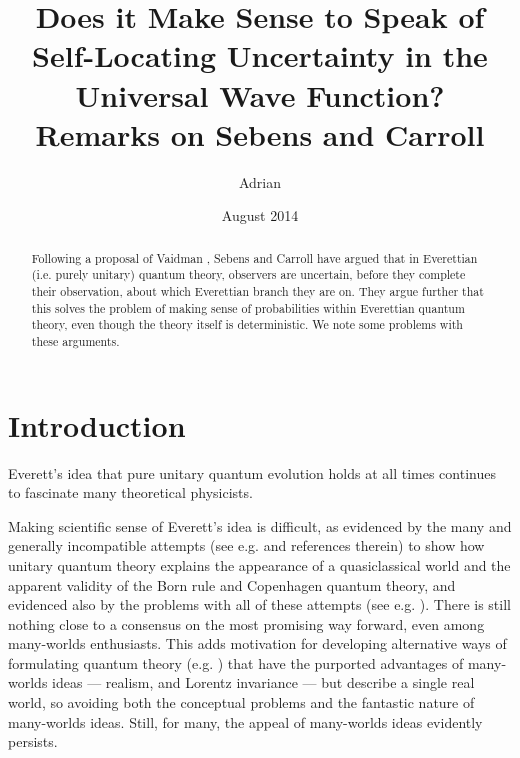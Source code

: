 \documentclass[aps,prl,12pt]{revtex4}
\begin{document}
\title{Does it Make Sense to Speak of
Self-Locating Uncertainty in the Universal Wave
Function? Remarks on Sebens and Carroll}

\author{Adrian }

\date{August 2014} 

\begin{abstract}
Following a proposal of Vaidman \cite{vaidman1998,vaidman2008,vaidman2011},
Sebens and Carroll \cite{cs1,cs2} have argued that 
in Everettian (i.e. purely unitary) quantum theory,
observers are uncertain, before they complete
their observation, about which Everettian
branch they are on.  They argue further that this
solves the problem of making sense of probabilities within 
Everettian quantum theory, even though
the theory itself is deterministic.
We note some problems with these arguments.   
\end{abstract}
\maketitle
  
\section{Introduction}

Everett's idea \cite{everett1957relative} that pure unitary quantum
evolution holds at all times continues to 
fascinate many theoretical physicists.

Making scientific sense of Everett's idea is difficult,
as evidenced by the many and generally incompatible attempts 
(see e.g. \cite{dewittmany,mwbook,geroch1984everett,deutsch1996comment,zurek2009quantum,gell1990quantum,hartle1991quantum,vaidman2011}
and references therein)
to
show how unitary quantum theory explains the appearance
of a quasiclassical world and the 
apparent validity of the Born rule and Copenhagen
quantum theory, and evidenced also by the problems with
all of these attempts (see e.g.
\cite{bell2004speakable,kent1990against,albert1988interpreting,kentoneworld,albert,price}). 
There is still nothing close to a consensus
on the most promising way forward, even among
many-worlds enthusiasts.  This adds motivation
for developing alternative ways of  
formulating quantum theory (e.g. \cite{kentsolution}) 
that have the purported advantages
of many-worlds ideas --- realism, and Lorentz invariance ---
but describe a single real world, so avoiding both
the conceptual problems and the fantastic nature of
many-worlds ideas.   Still, for many, the appeal of many-worlds
ideas evidently persists.   
\end{document}
